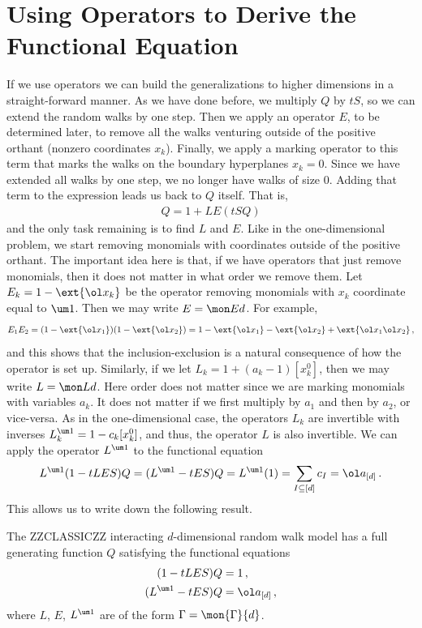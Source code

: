 \section{Using Operators to Derive the Functional Equation}
If we use operators we can build the generalizations to higher dimensions in a straight-forward manner. As we have done before, we multiply $Q$ by $tS$, so we can extend the random walks by one step. Then we apply an operator $E$, to be determined later, to remove all the walks venturing outside of the positive orthant (nonzero coordinates $x_k$). Finally, we apply a marking operator to this term that marks the walks on the boundary hyperplanes $x_k = 0$. Since we have extended all walks by one step, we no longer have walks of size 0. Adding that term to the expression leads us back to $Q$ itself. That is,
\begin{align}
	Q = 1 + LE(tSQ)
\end{align}
and the only task remaining is to find $L$ and $E$. Like in the one-dimensional problem, we start removing monomials with coordinates outside of the positive orthant. The important idea here is that, if we have operators that just remove monomials, then it does not matter in what order we remove them. Let $E_k = 1 - \ext{\ol x_k}$ be the operator removing monomials with $x_k$ coordinate equal to $\um 1$. Then we may write $E = \mon Ed$. For example,
\begin{align}
	E_1E_2 = (1-\ext{\ol x_1})(1-\ext{\ol x_2}) = 1-\ext{\ol x_1}-\ext{\ol x_2}+\ext{\ol x_1\ol x_2}\,,
\end{align}
and this shows that the inclusion-exclusion is a natural consequence of how the operator is set up. Similarly, if we let $L_k = 1 + (a_k-1)[x_k^0]$, then we may write $L = \mon Ld$. Here order does not matter since we are marking monomials with variables $a_k$. It does not matter if we first multiply by $a_1$ and then by $a_2$, or vice-versa. As in the one-dimensional case, the operators $L_k$ are invertible with inverses $L_k^{\um 1} = 1 - c_k[x_k^0]$, and thus, the operator $L$ is also invertible. We can apply the operator $L^{\um 1}$ to the functional equation
\begin{align}
	L^{\um 1}(1-tLES)Q = (L^{\um 1}- tES)Q = L^{\um 1}(1) = \sum_{I\subseteq [d]}c_I = \ol a_{[d]}\,.
\end{align}
This allows us to write down the following result.
\begin{prop} The ZZCLASSICZZ interacting $d$-dimensional random walk model has a full generating function $Q$ satisfying the functional equations
\begin{align}
	(1-tLES)Q &= 1\,,\\
	(L^{\um 1}-tES)Q &= \ol a_{[d]}\,,
\end{align}
where $L$, $E$, $L^{\um 1}$ are of the form $\Gamma = \mon{\Gamma}{d}$.
\end{prop}
